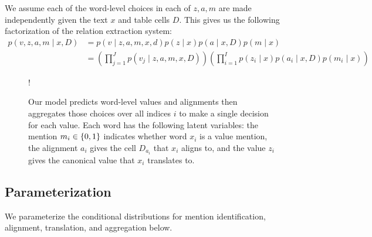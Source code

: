 \documentclass[12pt]{article}
\begin{document}
We assume each of the word-level choices in each of $z,a,m$ are made independently
given the text $x$ and table cells $D$.
This gives us the following factorization of the relation extraction system:
\begin{equation}
\label{eqn:prob}
\begin{aligned}
p(v,z,a,m\mid x,D)
&= p(v\mid z,a,m,x,d)p(z\mid x)p(a\mid x,D)p(m\mid x)\\
&= \left(\prod_{j=1}^J p(v_j\mid z,a,m,x,D)\right)
\left(\prod_{i=1}^I p(z_i\mid x)p(a_i\mid x,D)p(m_i\mid x)\right)
\end{aligned}
\end{equation}

\begin{figure}[h]
\begin{center}
\resizebox {.35\columnwidth} {!} {
} %
\end{center}
\caption{Our model predicts word-level values and alignments
then aggregates those choices over all indices $i$ to
make a single decision for each value.
Each word has the following latent variables:
the mention $m_i \in \left\{0,1\right\}$ indicates whether word $x_i$ is a value mention,
the alignment $a_i$ gives the cell $D_{a_i}$ that $x_i$ aligns to,
and the value $z_i$ gives the canonical value that $x_i$ translates to.
}
\label{fig:infmodel}
\end{figure}

\subsection{Parameterization}
We parameterize the conditional distributions for
mention identification, alignment, translation, and aggregation below.
\end{document}
